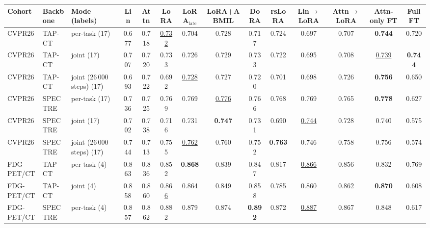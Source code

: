 \begin{tabular}{lllccccccccccc}
\toprule
Cohort & Backbone & Mode (labels) & Lin & Attn & LoRA & LoRA$_{\text{late}}$ & LoRA+ABMIL & DoRA & rsLoRA & Lin$\to$LoRA & Attn$\to$LoRA & Attn-only FT & Full FT \\
\midrule
CVPR26 & TAP-CT & per-task (17) & 0.677 & 0.718 & \underline{0.732} & 0.704 & 0.728 & 0.717 & \cellcolor{modebest}0.724 & \cellcolor{modebest}0.697 & 0.707 & \cellcolor{modebest}\textbf{0.744} & 0.720 \\
CVPR26 & TAP-CT & joint (17) & \cellcolor{modebest}0.707 & \cellcolor{modebest}0.720 & \cellcolor{modebest}0.733 & \cellcolor{modebest}0.726 & \cellcolor{modebest}0.729 & \cellcolor{modebest}0.733 & 0.722 & 0.695 & \cellcolor{modebest}0.708 & \underline{0.739} & \cellcolor{modebest}\textbf{0.744} \\
CVPR26 & TAP-CT & joint (26\,000 steps) (17) & 0.693 & 0.722 & 0.692 & \underline{0.728} & 0.727 & 0.720 & 0.701 & 0.698 & 0.726 & \textbf{0.756} & 0.650 \\
\addlinespace[2pt]
CVPR26 & SPECTRE & per-task (17) & \cellcolor{modebest}0.736 & 0.725 & \cellcolor{modebest}0.769 & \cellcolor{modebest}0.769 & \cellcolor{modebest}\underline{0.776} & \cellcolor{modebest}0.766 & \cellcolor{modebest}0.768 & \cellcolor{modebest}0.769 & \cellcolor{modebest}0.765 & \cellcolor{modebest}\textbf{0.778} & \cellcolor{modebest}0.627 \\
CVPR26 & SPECTRE & joint (17) & 0.702 & \cellcolor{modebest}0.738 & 0.716 & 0.731 & \textbf{0.747} & 0.731 & 0.690 & \underline{0.744} & 0.728 & 0.740 & 0.575 \\
CVPR26 & SPECTRE & joint (26\,000 steps) (17) & 0.744 & 0.713 & 0.755 & \underline{0.762} & 0.760 & 0.752 & \textbf{0.763} & 0.746 & 0.758 & 0.756 & 0.574 \\
\addlinespace[2pt]
FDG-PET/CT & TAP-CT & per-task (4) & \cellcolor{modebest}0.863 & 0.836 & 0.852 & \cellcolor{modebest}\textbf{0.868} & 0.839 & 0.847 & \cellcolor{modebest}0.817 & \cellcolor{modebest}\underline{0.866} & 0.856 & 0.832 & \cellcolor{modebest}0.769 \\
FDG-PET/CT & TAP-CT & joint (4) & 0.858 & \cellcolor{modebest}0.860 & \cellcolor{modebest}\underline{0.866} & 0.864 & \cellcolor{modebest}0.849 & \cellcolor{modebest}0.858 & 0.785 & 0.860 & \cellcolor{modebest}0.862 & \cellcolor{modebest}\textbf{0.870} & 0.608 \\
\addlinespace[2pt]
FDG-PET/CT & SPECTRE & per-task (4) & 0.857 & 0.862 & 0.882 & 0.879 & 0.874 & \textbf{0.892} & 0.872 & \cellcolor{modebest}\underline{0.887} & 0.867 & 0.848 & 0.617 \\

\end{tabular}
